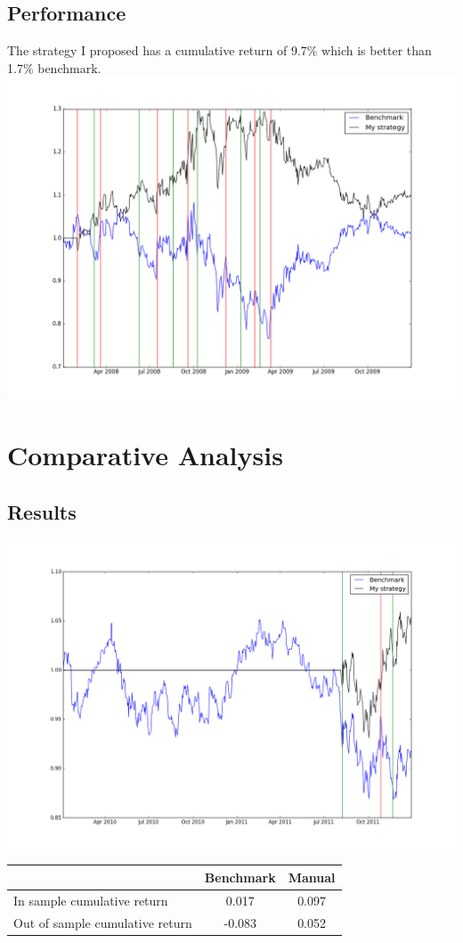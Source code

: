 \documentclass[a4paper]{article}
\begin{document}
\subsection{Performance}
	The strategy I proposed has a cumulative return of 9.7\% which is better than 1.7\% benchmark.
	\includegraphics[width=\textwidth]{in_sample_manual}

\section{Comparative Analysis}
\subsection{Results}
\includegraphics[width=\textwidth]{out_sample_manual}
\begin{center}
\begin{tabular}{ | l | c | c |}
\hline
			                     & Benchmark & Manual \\ \hline
In sample cumulative return      & 0.017     & 0.097 \\ \hline
Out of sample cumulative return  & -0.083    & 0.052 \\ \hline

\end{tabular}
\end{center}
\end{document}

